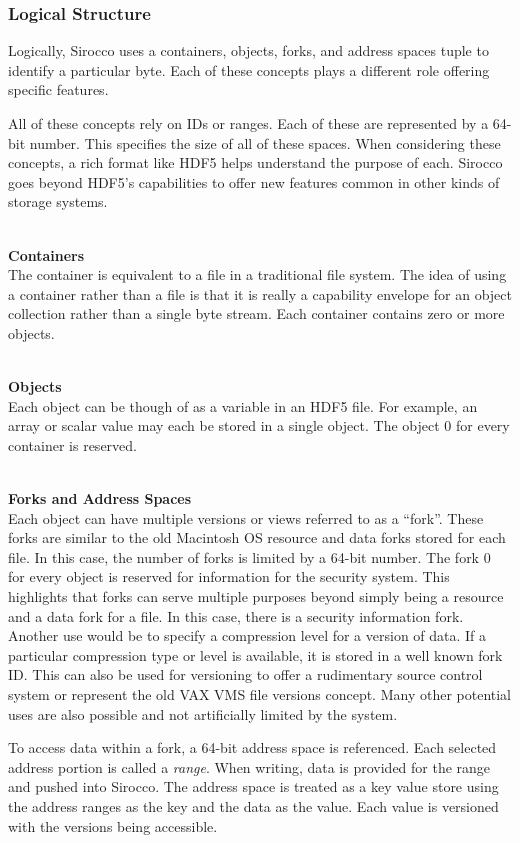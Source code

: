 \subsubsection{Logical Structure}
Logically, Sirocco uses a containers, objects, forks, and address spaces tuple to identify a particular byte. Each of these concepts plays a different role offering specific features.

All of these concepts rely on IDs or ranges. Each of these are represented by a 64-bit number. This specifies the size of all of these spaces. When considering these concepts, a rich format like HDF5 helps understand the purpose of each. Sirocco goes beyond HDF5's capabilities to offer new features common in other kinds of storage systems.

~\\\noindent\textbf{Containers}\\
The container is equivalent to a file in a traditional file system. The idea of
using a container rather than a file is that it is really a capability envelope
for an object collection rather than a single byte stream. Each container
contains zero or more objects.

~\\\noindent\textbf{Objects}\\
Each object can be though of as a variable in an HDF5 file. For example, an
array or scalar value may each be stored in a single object. The object 0 for
every container is reserved.

~\\\noindent\textbf{Forks and Address Spaces}\\
Each object can have multiple versions or views referred to as a ``fork''.
These forks are similar to the old Macintosh OS resource and data forks stored
for each file. In this case, the number of forks is limited by a 64-bit number.
The fork 0 for every object is reserved for information for the security
system. This highlights that forks can serve multiple purposes beyond simply
being a resource and a data fork for a file. In this case, there is a security
information fork. Another use would be to specify a compression level for a
version of data. If a particular compression type or level is available, it is
stored in a well known fork ID. This can also be used for versioning to offer a
rudimentary source control system or represent the old VAX VMS file versions
concept. Many other potential uses are also possible and not artificially
limited by the system.

To access data within a fork, a 64-bit address space is referenced. Each
selected address portion is called a {\em range}. When writing, data is provided
for the range and pushed into Sirocco. The address space is treated as a key
value store using the address ranges as the key and the data as the value. Each
value is versioned with the versions being accessible.

